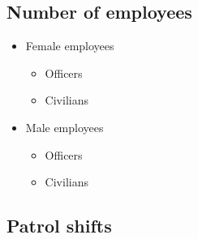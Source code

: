 \documentclass[
  12pt,
  openany]{book}
\providecommand{\tightlist}{%
  \setlength{\itemsep}{0pt}\setlength{\parskip}{0pt}}
\begin{document}
\hypertarget{number-of-employees}{%
\subsection{Number of employees}\label{number-of-employees}}

\begin{itemize}
\tightlist
\item
  Female employees

  \begin{itemize}
  \tightlist
  \item
    Officers
  \item
    Civilians
  \end{itemize}
\item
  Male employees

  \begin{itemize}
  \tightlist
  \item
    Officers
  \item
    Civilians
  \end{itemize}
\end{itemize}

\hypertarget{patrol-shifts}{%
\subsection{Patrol shifts}\label{patrol-shifts}}
\end{document}
